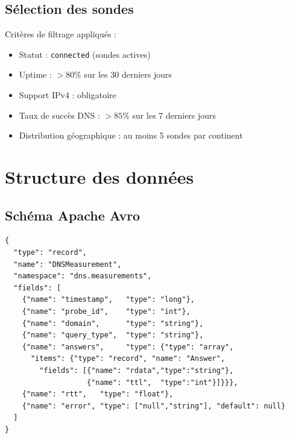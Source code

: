 \documentclass[a4paper,11pt]{book}
\begin{document}
\section{Sélection des sondes}

Critères de filtrage appliqués :
\begin{itemize}
    \item Statut : \texttt{connected} (sondes actives)
    \item Uptime : $>80\%$ sur les 30 derniers jours
    \item Support IPv4 : obligatoire
    \item Taux de succès DNS : $>85\%$ sur les 7 derniers jours
    \item Distribution géographique : au moins 5 sondes par continent
\end{itemize}

\chapter{Structure des données}

\section{Schéma Apache Avro}

\begin{lstlisting}[caption=Schéma Avro pour les résultats DNS]
{
  "type": "record",
  "name": "DNSMeasurement",
  "namespace": "dns.measurements",
  "fields": [
    {"name": "timestamp",   "type": "long"},
    {"name": "probe_id",    "type": "int"},
    {"name": "domain",      "type": "string"},
    {"name": "query_type",  "type": "string"},
    {"name": "answers",     "type": {"type": "array",
      "items": {"type": "record", "name": "Answer",
        "fields": [{"name": "rdata","type":"string"},
                   {"name": "ttl",  "type":"int"}]}}},
    {"name": "rtt",   "type": "float"},
    {"name": "error", "type": ["null","string"], "default": null}
  ]
}
\end{lstlisting}
\end{document}
